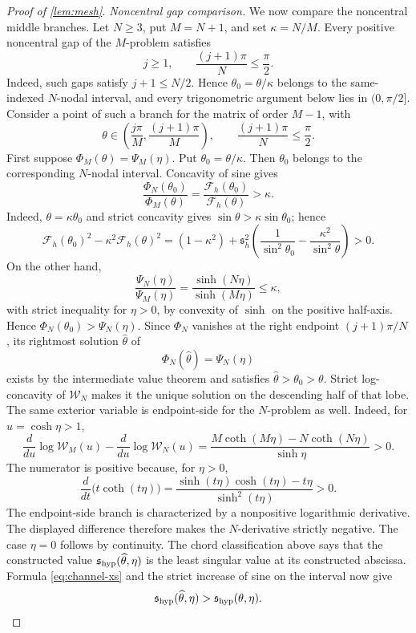 \documentclass[review,hidelinks,onefignum,onetabnum]{siamart251216}
\begin{document}
\begin{proof}[Proof of \cref{lem:mesh}]
\medskip\noindent\emph{Noncentral gap comparison.}\quad
We now compare the noncentral middle branches.  Let \(N\geq3\), put
\(M=N+1\), and set \(\kappa=N/M\).  Every positive noncentral gap of
the \(M\)-problem
satisfies
\begin{equation}\label{eq:noncentral-domain}
 j\geq1,\qquad \frac{(j+1)\pi}{N}\leq\frac{\pi}{2}.
\end{equation}
Indeed, such gaps satisfy \(j+1\leq N/2\).  Hence
\(\theta_0=\theta/\kappa\) belongs to the
same-indexed \(N\)-nodal interval, and every trigonometric argument
below lies in \((0,\pi/2]\).  Consider a point of such a branch for the
matrix of order \(M-1\), with
\[
 \theta\in\left(\frac{j\pi}{M},\frac{(j+1)\pi}{M}\right),
 \qquad \frac{(j+1)\pi}{N}\leq\frac{\pi}{2}.
\]
First suppose \(\Phi_M(\theta)=\Psi_M(\eta)\).  Put
\(\theta_0=\theta/\kappa\).  Then \(\theta_0\) belongs to the
corresponding \(N\)-nodal interval.  Concavity of sine gives
\begin{equation}\label{eq:Phi-scale}
 \frac{\Phi_N(\theta_0)}{\Phi_M(\theta)}
 =\frac{\mathcal F_h(\theta_0)}{\mathcal F_h(\theta)}>\kappa.
\end{equation}
Indeed, \(\theta=\kappa\theta_0\) and strict concavity gives
\(\sin\theta>\kappa\sin\theta_0\); hence
\[
 \mathcal F_h(\theta_0)^2-\kappa^2\mathcal F_h(\theta)^2
 =(1-\kappa^2)+\mathfrak s_h^2\left(
 \frac1{\sin^2\theta_0}-\frac{\kappa^2}{\sin^2\theta}
 \right)>0.
\]
On the other hand,
\begin{equation}\label{eq:Psi-scale}
 \frac{\Psi_N(\eta)}{\Psi_M(\eta)}
 =\frac{\sinh(N\eta)}{\sinh(M\eta)}\leq\kappa,
\end{equation}
with strict inequality for \(\eta>0\), by convexity of \(\sinh\) on
the positive half-axis.  Hence
\(\Phi_N(\theta_0)>\Psi_N(\eta)\).  Since \(\Phi_N\) vanishes at the right
endpoint \((j+1)\pi/N\), its rightmost solution
\(\widehat\theta\) of
\[
 \Phi_N(\widehat\theta)=\Psi_N(\eta)
\]
exists by the intermediate value theorem and satisfies
\(\widehat\theta>\theta_0>\theta\).  Strict log-concavity of
\(\mathcal W_N\) makes it the unique solution on the descending half
of that lobe.  The same exterior
variable is endpoint-side for the \(N\)-problem as well.  Indeed, for
\(u=\cosh\eta>1\),
\[
 \frac{d}{du}\log\mathcal W_M(u)-
 \frac{d}{du}\log\mathcal W_N(u)
 =\frac{M\coth(M\eta)-N\coth(N\eta)}{\sinh\eta}>0.
\]
The numerator is positive because, for \(\eta>0\),
\[
 \frac{d}{dt}\bigl(t\coth(t\eta)\bigr)
 =\frac{\sinh(t\eta)\cosh(t\eta)-t\eta}{\sinh^2(t\eta)}>0.
\]
The endpoint-side branch is characterized by a nonpositive logarithmic
derivative.  The displayed difference therefore makes the
\(N\)-derivative strictly negative.  The case \(\eta=0\) follows by
continuity.
The chord classification above says that the constructed value
\(\mathfrak s_{\rm hyp}(\widehat\theta,\eta)\) is the least singular
value at its constructed abscissa.  Formula
\eqref{eq:channel-xs} and the strict increase of sine on the interval
now give
\begin{equation}\label{eq:hyper-height-increase}
 \mathfrak s_{\rm hyp}(\widehat\theta,\eta)
 >\mathfrak s_{\rm hyp}(\theta,\eta).
\end{equation}


\end{proof}
\end{document}
